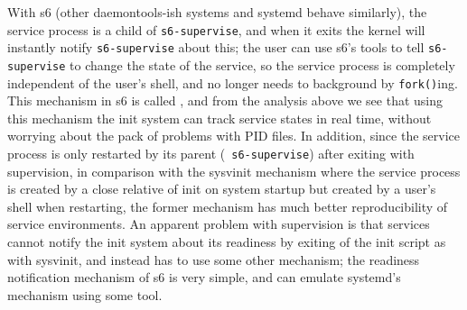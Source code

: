 With s6 (other daemontools-ish systems and systemd behave similarly), the
service process is a child of \verb|s6-supervise|, and when it exits the kernel
will instantly notify \verb|s6-supervise| about this; the user can use s6's
tools to tell \verb|s6-supervise| to change the state of the service, so the
service process is completely independent of the user's shell, and no longer
needs to background by \verb|fork()|ing.  This mechanism in s6 is called
, and from the analysis above we see that using
this mechanism the init system can track service states in real time, without
worrying about the pack of problems with PID files.  In addition, since the
service process is only restarted by its parent (\eg~\verb|s6-supervise|)
after exiting with supervision, in comparison with the sysvinit mechanism
where the service process is created by a close relative of init on system
startup but created by a user's shell when restarting, the former mechanism
has much better reproducibility of service environments.  An apparent
problem with supervision is that services cannot notify the init system
about its readiness by exiting of the init script as with sysvinit,
and instead has to use some other mechanism; the readiness notification
mechanism of s6 is very simple, and can emulate
systemd's mechanism using some tool.

